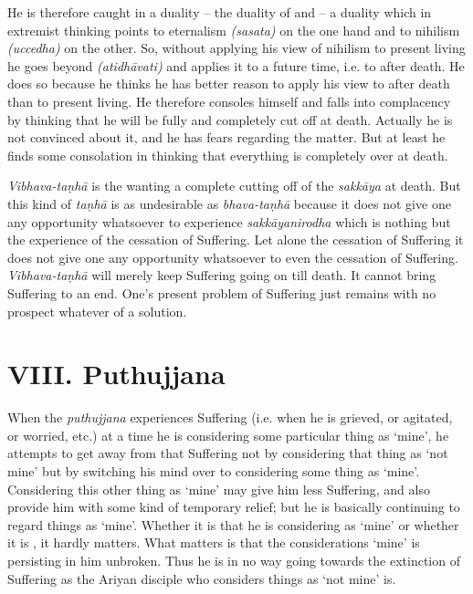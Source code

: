 He is therefore caught in a duality -- the duality of  and  -- a duality which in extremist thinking points to eternalism \emph{(sasata)} on the one hand and to nihilism \emph{(uccedha)} on the other. So, without applying his view of nihilism to present living he goes beyond \emph{(atidhāvati)} and applies it to a future time, i.e. to after death. He does so because he thinks he has better reason to apply his view to after death than to present living. He therefore consoles himself and falls into complacency by thinking that he will be fully and completely cut off at death. Actually he is not convinced about it, and he has fears regarding the matter. But at least he finds some consolation in thinking that everything is completely over at death.

\emph{Vibhava-taṇhā} is the wanting a complete cutting off of the \emph{sakkāya} at death. But this kind of \emph{taṇhā} is as undesirable as \emph{bhava-taṇhā} because it does not give one any opportunity whatsoever to experience \emph{sakkāyanirodha} which is nothing but the experience of the cessation of Suffering. Let alone  the cessation of Suffering it does not give one any opportunity whatsoever to even  the cessation of Suffering. \emph{Vibhava-taṇhā} will merely keep Suffering going on till death. It cannot bring Suffering to an end. One's present problem of Suffering just remains with no prospect whatever of a solution.

\section{VIII. Puthujjana}

When the \emph{puthujjana} experiences Suffering (i.e. when he is grieved, or agitated, or worried, etc.) at a time he is considering some particular thing as `mine', he attempts to get away from that Suffering not by considering that  thing as `not mine' but by switching his mind over to considering some  thing as `mine'. Considering this other thing as `mine' may give him less Suffering, and also provide him with some kind of temporary relief; but he is basically continuing to regard things as `mine'. Whether it is  that he is considering as `mine' or whether it is , it hardly matters. What matters is that the considerations `mine' is persisting in him unbroken. Thus he is in no way going towards the extinction of Suffering as the Ariyan disciple who considers things as `not mine' is.

